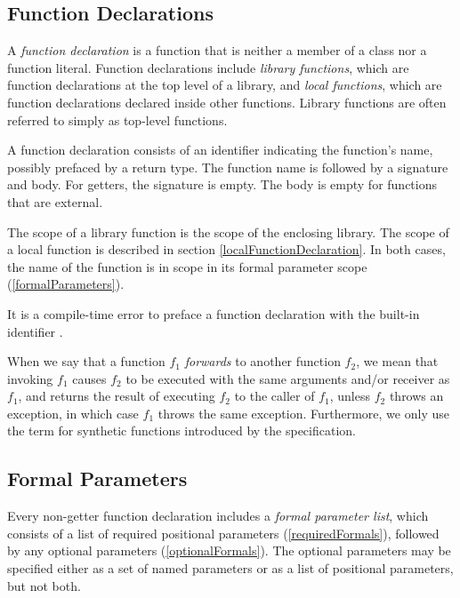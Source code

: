 \documentclass{article}
\begin{document}
\subsection{Function Declarations}

\LMHash{}
A {\em function declaration} is a function that is neither a member of a class nor a function literal.
Function declarations include {\em library functions}, which are function declarations
at the top level of a library, and {\em local functions}, which are function declarations declared inside other functions.
Library functions are often referred to simply as top-level functions.

\LMHash{}
A function declaration consists of an identifier indicating the function's name, possibly prefaced by a return type.
The function name is followed by a signature and body.
For getters, the signature is empty.
The body is empty for functions that are external.

\LMHash{}
The scope of a library function is the scope of the enclosing library.
The scope of a local function is described in section \ref{localFunctionDeclaration}.
In both cases, the name of the function is in scope in its formal parameter scope (\ref{formalParameters}).

\LMHash{}
It is a compile-time error to preface a function declaration with the built-in identifier \STATIC{}.

\LMHash{}
When we say that a function $f_1$ {\em forwards} to another function $f_2$, we mean that invoking $f_1$ causes $f_2$ to be executed with the same arguments and/or receiver as $f_1$, and returns the result of executing $f_2$ to the caller of $f_1$, unless $f_2$ throws an exception, in which case $f_1$ throws the same exception.
Furthermore, we only use the term for synthetic functions introduced by the specification.


\subsection{Formal Parameters}

\LMHash{}
Every non-getter function declaration includes a {\em formal parameter list},
which consists of a list of required positional parameters (\ref{requiredFormals}),
followed by any optional parameters (\ref{optionalFormals}).
The optional parameters may be specified either as a set of named parameters or as a list of positional parameters, but not both.
\end{document}
